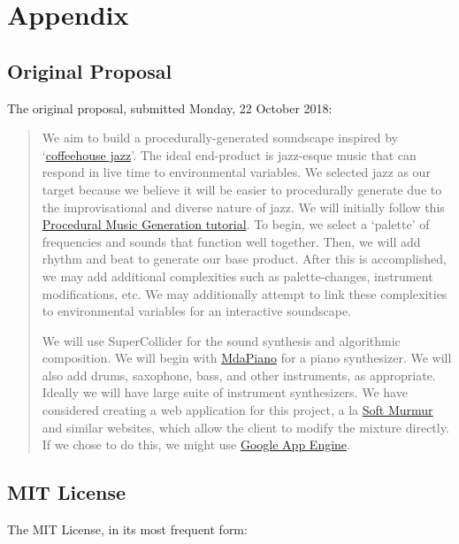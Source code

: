 \documentclass[12pt,a4paper]{article}
\begin{document}
\section{Appendix}

\subsection{Original Proposal}
The original proposal, submitted Monday, 22 October 2018:
\begin{quote}
We aim to build a procedurally-generated soundscape inspired by `\href{https://www.youtube.com/watch?v=K2Q6YO3Ez44}{coffeehouse jazz}'. The ideal end-product is jazz-esque music that can respond in live time to environmental variables. We selected jazz as our target because we believe it will be easier to procedurally generate due to the improvisational and diverse nature of jazz. We will initially follow this \href{http://www.procjam.com/tutorials/en/music/}{Procedural Music Generation tutorial}. To begin, we select a `palette' of frequencies and sounds that function well together. Then, we will add rhythm and beat to generate our base product. After this is accomplished, we may add additional complexities such as palette-changes, instrument modifications, etc. We may additionally attempt to link these complexities to environmental variables for an interactive soundscape.

We will use SuperCollider for the sound synthesis and algorithmic composition. We will begin with \href{http://doc.sccode.org/Classes/MdaPiano.html}{MdaPiano} for a piano synthesizer. We will also add drums, saxophone, bass, and other instruments, as appropriate. Ideally we will have large suite of instrument synthesizers. We have considered creating a web application for this project, a la \href{https://asoftmurmur.com/}{Soft Murmur} and similar websites, which allow the client to modify the mixture directly. If we chose to do this, we might use \href{https://console.cloud.google.com/projectselector/appengine}{Google App Engine}. 
\end{quote}

\subsection{MIT License}
The MIT License, in its most frequent form:
\end{document}
